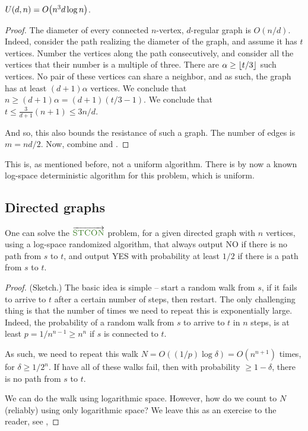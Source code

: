 \begin{lemma}
    $U(d,n) = O\pth[\!\ts]{n^3 d \log n}$.
\end{lemma}

\begin{proof}
    The diameter of every connected $n$-vertex, $d$-regular graph is
    $O(n/d)$. Indeed, consider the path realizing the diameter of the
    graph, and assume it has $t$ vertices. Number the vertices along
    the path consecutively, and consider all the vertices that their
    number is a multiple of three. There are $\alpha \geq \left\lfloor {t/3} \right\rfloor$
    such vertices. No pair of these vertices can share a neighbor, and
    as such, the graph has at least $(d+1) \alpha$ vertices. We
    conclude that $n \geq (d+1) \alpha = (d+1) (t/3 -1)$. We conclude
    that $t \leq \frac{3}{d+1} (n+1) \leq 3n/d$.

 And so, this also bounds the resistance of such a
    graph. The number of edges is $m=nd/2$. Now, combine
     and .
\end{proof}

This is, as mentioned before, not a uniform algorithm. There is by now
a known log-space deterministic algorithm for this problem, which is
uniform.


\subsection{Directed graphs}

\begin{theorem}
    One can solve the $\STCON$ problem, for a given directed graph
    with $n$ vertices, using a log-space randomized algorithm, that
    always output NO if there is no path from $s$ to $t$, and output
    YES with probability at least $1/2$ if there is a path from $s$ to
    $t$.
\end{theorem}
\begin{proof}
    (Sketch.) The basic idea is simple -- start a random walk from $s$, if it
    fails to arrive to $t$ after a certain number of steps, then
    restart. The only challenging thing is that the number of times we
    need to repeat this is exponentially large. Indeed, the
    probability of a random walk from $s$  to arrive to $t$ in $n$
    steps, is at least $p = 1/n^{n-1} \geq n^n$ if $s$ is connected to $t$.

    As such, we need to repeat this walk
    $N = O((1/p) \log \delta) = O( n^{n+1})$ times, for
    $\delta \geq 1/2^n$.  If have all of these walks fail, then with
    probability $\geq 1-\delta$, there is no path from $s$ to $t$.

    We can do the walk using logarithmic space. However, how do we
    count to $N$ (reliably) using only logarithmic space? We leave
    this as an exercise to the reader, see ,
\end{proof}


